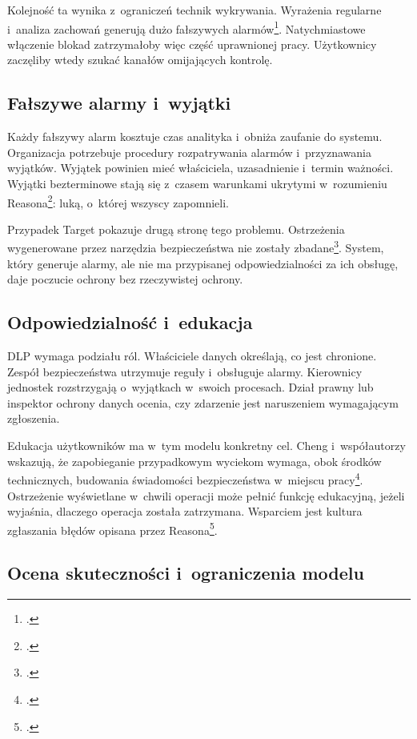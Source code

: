 \documentclass[12pt,a4paper]{article}
\begin{document}
Kolejność ta wynika z~ograniczeń technik wykrywania. Wyrażenia regularne
i~analiza zachowań generują dużo fałszywych
alarmów\footcite{cheng2017enterprise}. Natychmiastowe włączenie blokad
zatrzymałoby więc część uprawnionej pracy. Użytkownicy zaczęliby wtedy
szukać kanałów omijających kontrolę.

\subsection{Fałszywe alarmy i~wyjątki}

Każdy fałszywy alarm kosztuje czas analityka i~obniża zaufanie do systemu.
Organizacja potrzebuje procedury rozpatrywania alarmów i~przyznawania
wyjątków. Wyjątek powinien mieć właściciela, uzasadnienie i~termin ważności.
Wyjątki bezterminowe stają się z~czasem warunkami ukrytymi w~rozumieniu
Reasona\footcite{reason2000human}: luką, o~której wszyscy zapomnieli.

Przypadek Target pokazuje drugą stronę tego problemu. Ostrzeżenia
wygenerowane przez narzędzia bezpieczeństwa nie zostały
zbadane\footcite{cheng2017enterprise}. System, który generuje alarmy, ale nie
ma przypisanej odpowiedzialności za ich obsługę, daje poczucie ochrony bez
rzeczywistej ochrony.

\subsection{Odpowiedzialność i~edukacja}

DLP wymaga podziału ról. Właściciele danych określają, co jest chronione.
Zespół bezpieczeństwa utrzymuje reguły i~obsługuje alarmy. Kierownicy
jednostek rozstrzygają o~wyjątkach w~swoich procesach. Dział prawny lub
inspektor ochrony danych ocenia, czy zdarzenie jest naruszeniem wymagającym
zgłoszenia.

Edukacja użytkowników ma w~tym modelu konkretny cel. Cheng i~współautorzy
wskazują, że zapobieganie przypadkowym wyciekom wymaga, obok środków
technicznych, budowania świadomości bezpieczeństwa w~miejscu
pracy\footcite{cheng2017enterprise}. Ostrzeżenie wyświetlane w~chwili
operacji może pełnić funkcję edukacyjną, jeżeli wyjaśnia, dlaczego operacja
została zatrzymana. Wsparciem jest kultura zgłaszania błędów opisana przez
Reasona\footcite{reason2000human}.

\subsection{Ocena skuteczności i~ograniczenia modelu}
\end{document}
